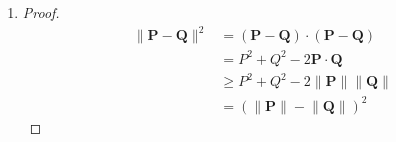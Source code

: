 \documentclass[a4paper]{report}
\newcommand{\vect}{\mathbf}
\begin{document}
\begin{enumerate}
\begin{proof}
\begin{equation*}
			\end{equation*}
			\begin{align*}
				((\vect{P} \cdot \vect{R}) \vect{Q} - (\vect{Q} \cdot \vect{R}) \vect{P})_x
				&= \vect{P}_x \vect{Q}_x \vect{R}_x + \vect{P}_y \vect{Q}_x \vect{R}_y + \vect{P}_z \vect{Q}_x \vect{R}_z - \vect{P}_x \vect{Q}_x \vect{R}_x - \vect{P}_x \vect{Q}_y \vect{R}_y - \vect{P}_x \vect{Q}_z \vect{R}_z\\
				&= \vect{P}_z \vect{Q}_x \vect{R}_z - \vect{P}_x \vect{Q}_z \vect{R}_z - \vect{P}_x \vect{Q}_y \vect{R}_y + \vect{P}_y \vect{Q}_x \vect{R}_y,
			\end{align*}
			The $y$ and $z$ components can be checked in a similar manner.
		\end{proof}
	\item
		\begin{proof}
			\begin{align*}
				\lVert \vect{P} - \vect{Q} \rVert^2
				&= (\vect{P} - \vect{Q}) \cdot (\vect{P} - \vect{Q})\\
				&= P^2 + Q^2 - 2 \vect{P} \cdot \vect{Q}\\
				&\geq P^2 + Q^2 - 2 \lVert \vect{P} \rVert \lVert \vect{Q} \rVert\\
				&= (\lVert \vect{P} \rVert - \lVert \vect{Q} \rVert)^2
			\end{align*}
		\end{proof}
\end{enumerate}
\end{document}
